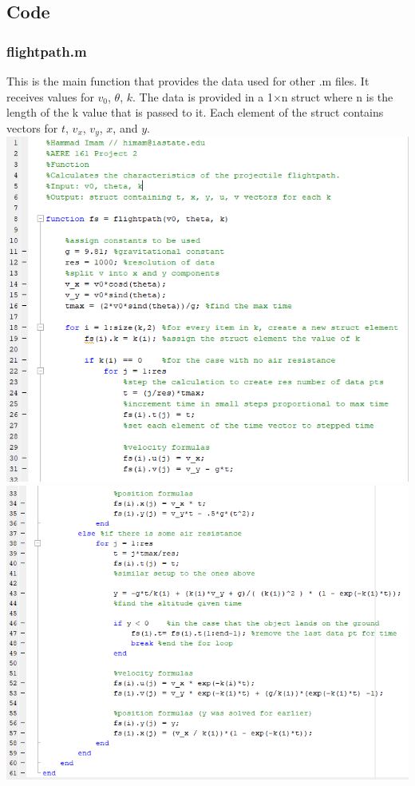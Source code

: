 \documentclass[oneside]{article}
\begin{document}
\subsection{Code}
\subsubsection{flightpath.m}
This is the main function that provides the data used for other .m files. It receives values for $v_0$, $\theta$, $k$. The data is provided in a 1$\times$n struct where n is the length of the k value that is passed to it. Each element of the struct contains vectors for $t$, $v_x$, $v_y$, $x$, and $y$.\\ 
\includegraphics [width=\linewidth*4/5]{code_flightpath1.png}\\
\includegraphics [width=\linewidth*4/5]{code_flightpath2.png}
\newpage
\end{document}
